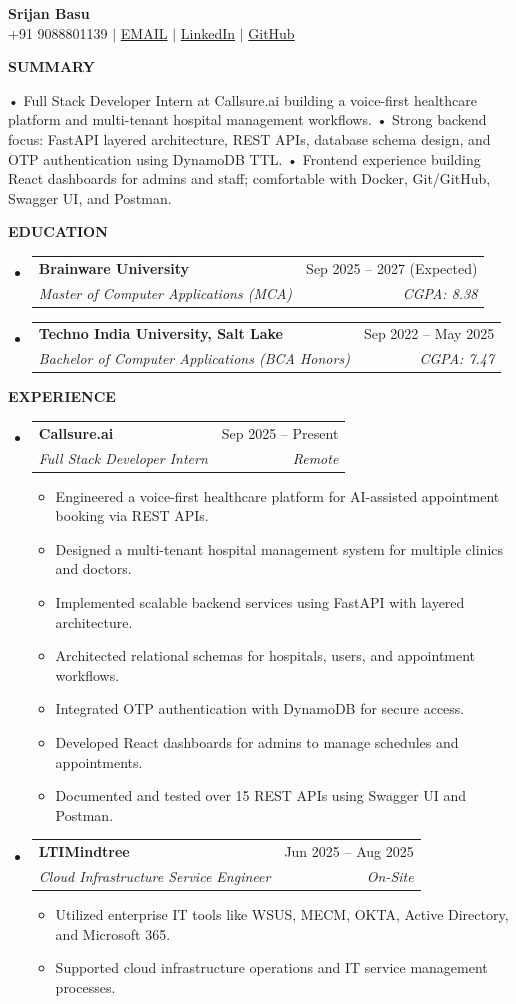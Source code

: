 \documentclass[a4paper,10pt]{article}
\makeatletter
\newcommand{\resheading}[1]{
  \vspace{8pt}
  {\color{black} \textbf{\large #1}}
  \vspace{-5pt}
  \hrulefill
  \vspace{3pt}
}
\newcommand{\ressubheading}[4]{
  \begin{tabular*}{\textwidth}{l@{\extracolsep{\fill}}r}
    \textbf{#1} & #2 \\
    \textit{\small #3} & \textit{\small #4} \\
  \end{tabular*}\vspace{-5pt}
}
\newcommand{\resitem}[1]{
  \item \small{
    {#1 \vspace{-2pt}}
  }
}
\makeatother
\begin{document}
\begin{center}
    \textbf{\Huge Srijan Basu} \\ \vspace{3pt}
    \small +91 9088801139 $|$ \href{mailto:2003srijanbasu@gmail.com}{{{EMAIL}}} $|$ 
    \href{https://}{LinkedIn} $|$ 
    \href{https://}{GitHub} 
\end{center}

\resheading{SUMMARY}
\small • Full Stack Developer Intern at Callsure.ai building a voice-first healthcare platform and multi-tenant hospital management workflows.
• Strong backend focus: FastAPI layered architecture, REST APIs, database schema design, and OTP authentication using DynamoDB TTL.
• Frontend experience building React dashboards for admins and staff; comfortable with Docker, Git/GitHub, Swagger UI, and Postman.


\resheading{EDUCATION}
\begin{itemize}[leftmargin=*,nosep]
\item[] \ressubheading{Brainware University}{Sep 2025 – 2027 (Expected)}{Master of Computer Applications (MCA)}{CGPA: 8.38}
\item[] \ressubheading{Techno India University, Salt Lake}{Sep 2022 – May 2025}{Bachelor of Computer Applications (BCA Honors)}{CGPA: 7.47}
\end{itemize}

\resheading{EXPERIENCE}
\begin{itemize}[leftmargin=*,nosep]
\item[] \ressubheading{Callsure.ai}{Sep 2025 – Present}{Full Stack Developer Intern}{Remote}
\begin{itemize}[leftmargin=12pt,nosep,topsep=2pt]
  \resitem{Engineered a voice-first healthcare platform for AI-assisted appointment booking via REST APIs.}
  \resitem{Designed a multi-tenant hospital management system for multiple clinics and doctors.}
  \resitem{Implemented scalable backend services using FastAPI with layered architecture.}
  \resitem{Architected relational schemas for hospitals, users, and appointment workflows.}
  \resitem{Integrated OTP authentication with DynamoDB for secure access.}
  \resitem{Developed React dashboards for admins to manage schedules and appointments.}
  \resitem{Documented and tested over 15 REST APIs using Swagger UI and Postman.}
\end{itemize}
\item[] \ressubheading{LTIMindtree}{Jun 2025 – Aug 2025}{Cloud Infrastructure Service Engineer}{On-Site}
\begin{itemize}[leftmargin=12pt,nosep,topsep=2pt]
  \resitem{Utilized enterprise IT tools like WSUS, MECM, OKTA, Active Directory, and Microsoft 365.}
  \resitem{Supported cloud infrastructure operations and IT service management processes.}
\end{itemize}
\end{itemize}
\end{document}
